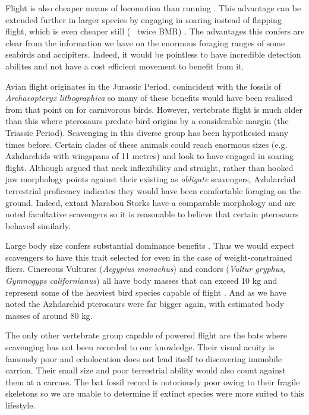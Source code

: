 \documentclass[a4paper,12pt]{article}
\begin{document}
Flight is also cheaper means of locomotion than running \citep{tucker1975energetic}. This advantage can be extended further in larger species by engaging in soaring instead of flapping flight, which is even cheaper still (~ twice BMR) \citep{hedenstrom1993migration}. The advantages this confers are clear from the information we have on the enormous foraging ranges of some seabirds and accipiters. Indeed, it would be pointless to have incredible detection abilites and not have a cost efficient movement to benefit from it. 

Avian flight originates in the Jurassic Period, conincident with the fossils of \textit{Archaeopteryx lithographica} so many of these benefits would have been realised from that point on for carnivorous birds. However, vertebrate flight is much older than this where pterosaurs predate bird origins by a considerable margin (the Triassic Period). Scavenging in this diverse group has been hypothesied many times before. Certain clades of these animals could reach enormous sizes (e.g. Azhdarchids with wingspans of 11 metres) and look to have engaged in soaring flight.  Although \cite{witton2008reappraisal} argued that neck inflexibility and straight, rather than hooked jaw morphology points against their existing as \textit{obligate} scavengers, Azhdarchid terrestrial proficency indicates they would have been comfortable foraging on the ground. Indeed, extant Marabou Storks have a comparable morphology and are noted facultative scavengers so it is reasonable to believe that certain pterosaurs behaved similarly.   

Large body size confers substantial dominance benefits \citep{ruxton2004obligate}. Thus we would expect scavengers to have this trait selected for even in the case of weight-constrained fliers. Cinereous Vultures (\textit{Aegypius monachus}) and condors (\textit{Vultur gryphus}, \textit{Gymnogyps californianus}) all have body masses that can exceed 10 kg and represent some of the heaviest bird species capable of flight \citep{ferguson2001raptors,donazar2002effects}. And as we have noted the Azhdarchid pterosaurs were far bigger again, with estimated body masses of around 80 kg. 
 
The only other vertebrate group capable of powered flight are the bats where scavenging has not been recorded to our knowledge. Their visual acuity is famously poor and echolocation does not lend itself to discovering immobile carrion. Their small size and poor terrestrial ability would also count against them at a carcass. The bat fossil record is notoriously poor owing to their fragile skeletons so we are unable to determine if extinct species were more suited to this lifestyle. 
\end{document}
